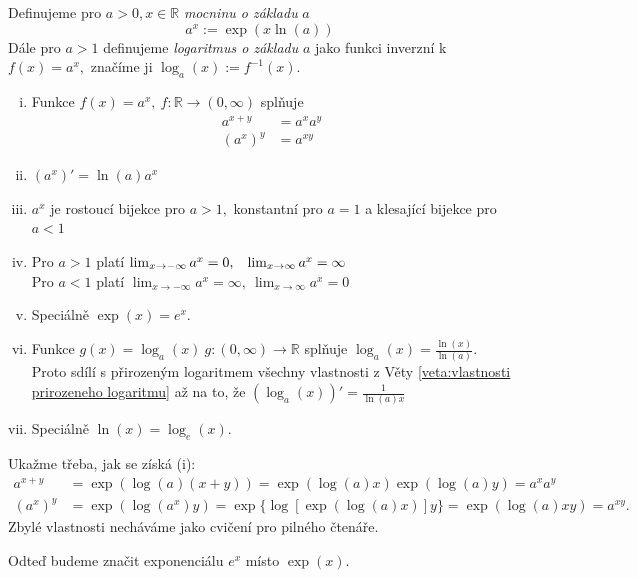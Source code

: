 \begin{definice}
	Definujeme pro $a>0, x\in \mathbb{R}$ \emph{mocninu o základu} $a$
  \begin{equation*}
    a^{x} := \exp(x \ln(a))
  \end{equation*}
  Dále pro $a>1$ definujeme \emph{logaritmus o základu} $a$ jako funkci inverzní k $f(x)=a^{x},$ značíme ji $\log_a(x):=f^{-1}(x).$
\end{definice}

\begin{věta}\leavevmode
\begin{enumerate}[(i)]
	\item Funkce $f(x)=a^{x},\ f\colon \mathbb{R}\to (0,\infty)$ splňuje
		\begin{align*}
			a^{x+y} &= a^{x}a^{y} \\
			(a^{x})^{y} &= a^{xy}
		\end{align*}
	\item $(a^{x})'=\ln(a)a^{x}$
	\item $a^{x}$ je rostoucí bijekce pro $a>1,$ konstantní pro $a=1$ a klesající bijekce pro $a<1$
	\item Pro $a>1$ platí $\lim_{x\to -\infty}a^{x}=0,\hspace{.85em} \lim_{x\to \infty}a^{x}=\infty$ \\
		Pro $a<1$ platí $\lim_{x\to -\infty}a^{x}=\infty,\ \lim_{x\to \infty}a^{x}=0$
	\item Speciálně $\exp(x)=e^{x}.$
	\item Funkce $g(x)=\log_a(x)\ g\colon (0,\infty)\to \mathbb{R}$ splňuje $\log_a(x)=\frac{\ln(x)}{\ln(a)}.$ Proto sdílí s přirozeným logaritmem všechny vlastnosti z Věty \ref{veta:vlastnosti prirozeneho logaritmu} až na to, že $(\log_a(x))'=\frac{1}{\ln(a)x}$
	\item Speciálně $\ln(x)=\log_e(x).$
\end{enumerate}
\end{věta}
\begin{důkaz}
  Ukažme třeba, jak se získá (i):
  \begin{align*}
	  a^{x+y} &= \exp(\log(a)(x+y))=\exp(\log(a)x)\exp(\log(a)y)=a^{x}a^{y} \\
	  (a^{x})^{y}&= \exp(\log(a^{x})y)=\exp\{\log[\exp(\log(a)x)]y\}=\exp(\log(a)xy)=a^{xy}.
  \end{align*}
  Zbylé vlastnosti necháváme jako cvičení pro pilného čtenáře.
\end{důkaz}
\begin{poznámka}
  Odteď budeme značit exponenciálu $e^{x}$ místo $\exp(x).$
\end{poznámka}

